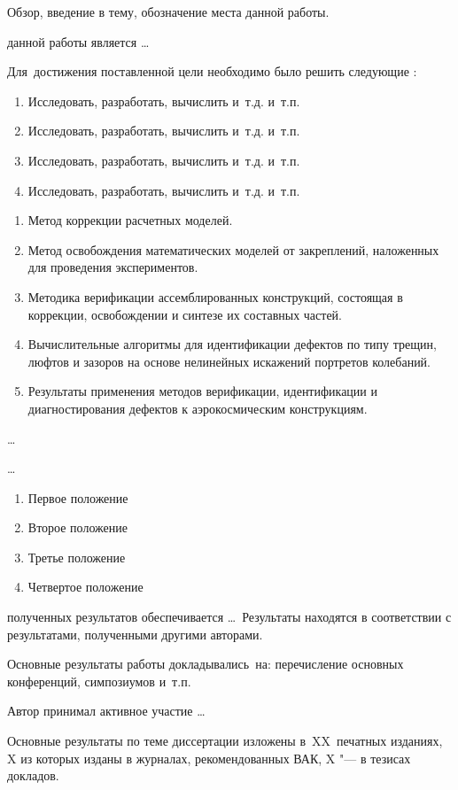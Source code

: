 
{\actuality} Обзор, введение в тему, обозначение места данной работы.

{\aim} данной работы является \ldots

Для~достижения поставленной цели необходимо было решить следующие {\tasks}:
\begin{enumerate}[beginpenalty=10000] 
	\item Исследовать, разработать, вычислить и~т.\:д. и~т.\:п.
	\item Исследовать, разработать, вычислить и~т.\:д. и~т.\:п.
	\item Исследовать, разработать, вычислить и~т.\:д. и~т.\:п.
	\item Исследовать, разработать, вычислить и~т.\:д. и~т.\:п.
\end{enumerate}


{\novelty}
\begin{enumerate}[beginpenalty=10000] 
	\item Метод коррекции расчетных моделей.
	\item Метод освобождения математических моделей от закреплений, наложенных для проведения экспериментов.
	\item Методика верификации ассемблированных конструкций, состоящая в коррекции, освобождении и синтезе их составных частей.
	\item Вычислительные алгоритмы для идентификации дефектов по типу трещин, люфтов и зазоров на основе нелинейных искажений портретов колебаний.
	\item Результаты применения методов верификации, идентификации и диагностирования дефектов к аэрокосмическим конструкциям.
\end{enumerate}

{\influence} \ldots

{\methods} \ldots

{}
\begin{enumerate}[beginpenalty=10000] 
	\item Первое положение
	\item Второе положение
	\item Третье положение
	\item Четвертое положение
\end{enumerate}

{\reliability} полученных результатов обеспечивается \ldots \ Результаты находятся в соответствии с результатами, полученными другими авторами.


{\probation}
Основные результаты работы докладывались~на:
перечисление основных конференций, симпозиумов и~т.\:п.

{\contribution} Автор принимал активное участие \ldots

{\publications} Основные результаты по теме диссертации изложены
в~XX~печатных изданиях,
X из которых изданы в журналах, рекомендованных ВАК,
X "--- в тезисах докладов.
